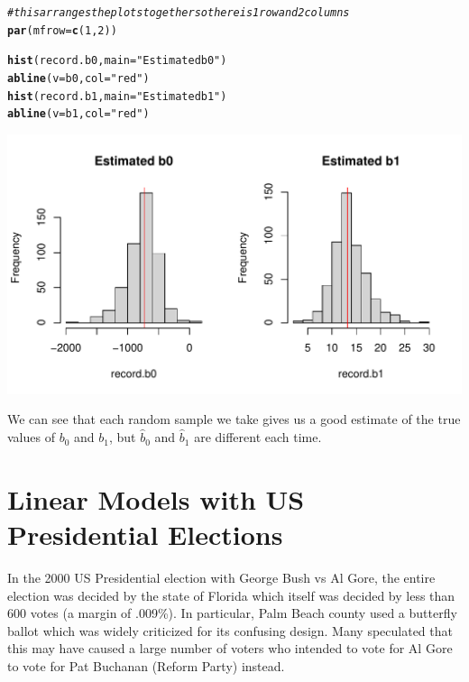 \documentclass{article}\usepackage[]{graphicx}\usepackage[]{color}
\makeatletter
\def\maxwidth{ %
  \ifdim\Gin@nat@width>\linewidth
    \linewidth
  \else
    \Gin@nat@width
  \fi
}
\newcommand{\hlnum}[1]{\textcolor[rgb]{0.686,0.059,0.569}{#1}}%
\newcommand{\hlstr}[1]{\textcolor[rgb]{0.192,0.494,0.8}{#1}}%
\newcommand{\hlcom}[1]{\textcolor[rgb]{0.678,0.584,0.686}{\textit{#1}}}%
\newcommand{\hlstd}[1]{\textcolor[rgb]{0.345,0.345,0.345}{#1}}%
\newcommand{\hlkwc}[1]{\textcolor[rgb]{0.333,0.667,0.333}{#1}}%
\newcommand{\hlkwd}[1]{\textcolor[rgb]{0.737,0.353,0.396}{\textbf{#1}}}%
\newenvironment{kframe}{%
 \def\at@end@of@kframe{}%
 \ifinner\ifhmode%
  \def\at@end@of@kframe{\end{minipage}}%
  \begin{minipage}{\columnwidth}%
 \fi\fi%
 \def\FrameCommand##1{\hskip\@totalleftmargin \hskip-\fboxsep
 \colorbox{shadecolor}{##1}\hskip-\fboxsep
     \hskip-\linewidth \hskip-\@totalleftmargin \hskip\columnwidth}%
 \MakeFramed {\advance\hsize-\width
   \@totalleftmargin\z@ \linewidth\hsize
   \@setminipage}}%
 {\par\unskip\endMakeFramed%
 \at@end@of@kframe}
\newenvironment{knitrout}{}{} %
\makeatother
\begin{document}
\begin{knitrout}
\color{fgcolor}\begin{kframe}
\begin{alltt}
\hlcom{# this arranges the plots together so there is 1 row and 2 columns}
\hlkwd{par}\hlstd{(}\hlkwc{mfrow} \hlstd{=} \hlkwd{c}\hlstd{(}\hlnum{1}\hlstd{,}\hlnum{2}\hlstd{))}

\hlkwd{hist}\hlstd{(record.b0,} \hlkwc{main} \hlstd{=} \hlstr{"Estimated b0"}\hlstd{)}
\hlkwd{abline}\hlstd{(}\hlkwc{v} \hlstd{= b0,} \hlkwc{col} \hlstd{=} \hlstr{"red"}\hlstd{)}
\hlkwd{hist}\hlstd{(record.b1,} \hlkwc{main} \hlstd{=} \hlstr{"Estimated b1"}\hlstd{)}
\hlkwd{abline}\hlstd{(}\hlkwc{v} \hlstd{= b1,} \hlkwc{col} \hlstd{=} \hlstr{"red"}\hlstd{)}
\end{alltt}
\end{kframe}

{\centering \includegraphics[width=\maxwidth]{figure/unnamed-chunk-12-1} 

}


\end{knitrout}

We can see that each random sample we take gives us a good estimate of the true values of $b_0$ and $b_1$, but $\hat b_0$ and $\hat b_1$ are different each time.


\newpage
\FloatBarrier


\section{Linear Models with US Presidential Elections}
In the 2000 US Presidential election with George Bush vs Al Gore, the entire election was decided by the state of Florida which itself was decided by less than 600 votes (a margin of .009\%). In particular, Palm Beach county used a butterfly ballot which was widely criticized for its confusing design. Many speculated that this may have caused a large number of voters who intended to vote for Al Gore to vote for Pat Buchanan (Reform Party) instead. 
 
\end{document}
